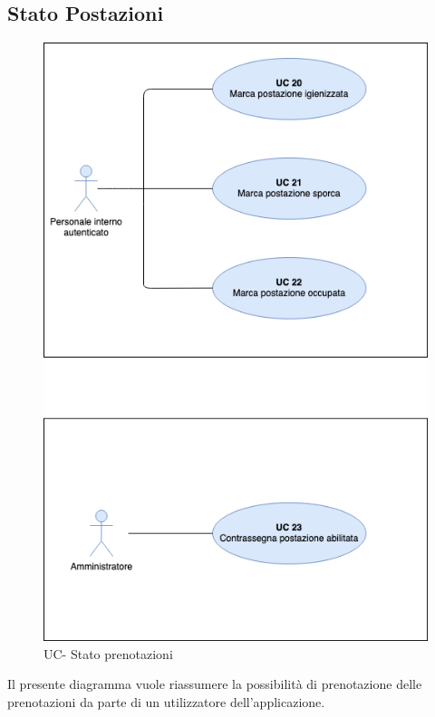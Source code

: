\subsection{Stato Postazioni}

\begin{figure}[h]
  \centering
    \includegraphics[scale=0.5]{src/CasiDUso/immagini/UC-statoPostazioni.png}
  \caption{UC- Stato prenotazioni}
\end{figure}

Il presente diagramma vuole riassumere la possibilità di prenotazione delle prenotazioni da parte di un utilizzatore dell’applicazione.


